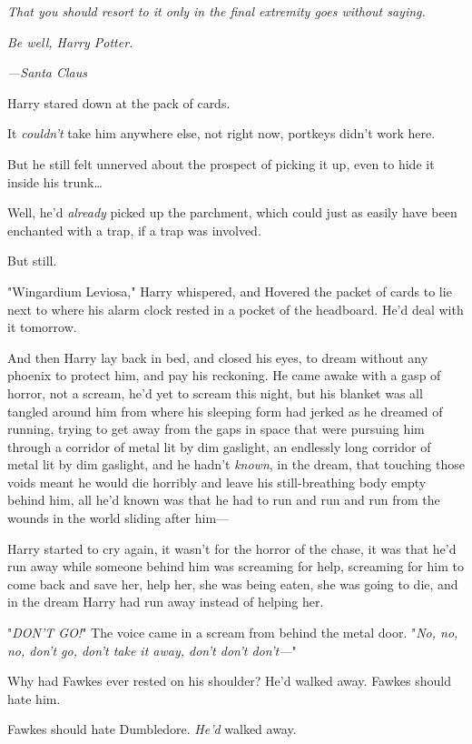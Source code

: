 \emph{That you should resort to it only in the final extremity goes without 
saying.}

\emph{Be well, Harry Potter.}

\emph{---Santa Claus}

Harry stared down at the pack of cards.

It \emph{couldn't} take him anywhere else, not right now, portkeys didn't work 
here.

But he still felt unnerved about the prospect of picking it up, even to hide it 
inside his trunk{\ldots}

Well, he'd \emph{already} picked up the parchment, which could just as easily 
have been enchanted with a trap, if a trap was involved.

But still.

"Wingardium Leviosa," Harry whispered, and Hovered the packet of cards to lie 
next to where his alarm clock rested in a pocket of the headboard. He'd deal 
with it tomorrow.

And then Harry lay back in bed, and closed his eyes, to dream without any 
phoenix to protect him, and pay his reckoning.
\sbreak
He came awake with a gasp of horror, not a scream, he'd yet to scream this 
night, but his blanket was all tangled around him from where his sleeping form 
had jerked as he dreamed of running, trying to get away from the gaps in space 
that were pursuing him through a corridor of metal lit by dim gaslight, an 
endlessly long corridor of metal lit by dim gaslight, and he hadn't 
\emph{known}, in the dream, that touching those voids meant he would die 
horribly and leave his still-breathing body empty behind him, all he'd known 
was that he had to run and run and run from the wounds in the world sliding 
after him---

Harry started to cry again, it wasn't for the horror of the chase, it was that 
he'd run away while someone behind him was screaming for help, screaming for 
him to come back and save her, help her, she was being eaten, she was going to 
die, and in the dream Harry had run away instead of helping her.

"\emph{DON'T GO!}" The voice came in a scream from behind the metal door. "\emph{No, 
no, no, don't go, don't take it away, don't don't don't---}"

Why had Fawkes ever rested on his shoulder? He'd walked away. Fawkes should 
hate him.

Fawkes should hate Dumbledore. \emph{He'd} walked away.

